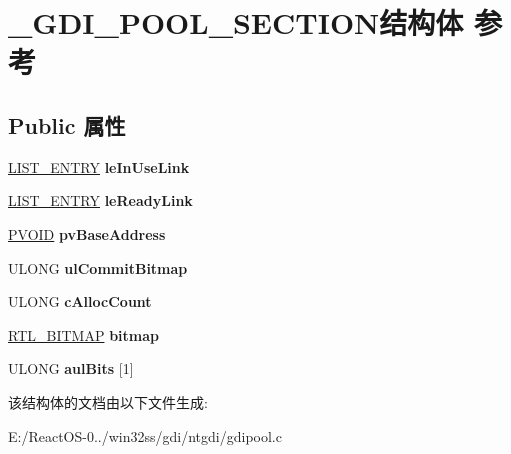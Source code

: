 \hypertarget{struct___g_d_i___p_o_o_l___s_e_c_t_i_o_n}{}\section{\+\_\+\+G\+D\+I\+\_\+\+P\+O\+O\+L\+\_\+\+S\+E\+C\+T\+I\+O\+N结构体 参考}
\label{struct___g_d_i___p_o_o_l___s_e_c_t_i_o_n}
\subsection*{Public 属性}
\begin{DoxyCompactItemize}
\item 
\mbox{\label{struct___g_d_i___p_o_o_l___s_e_c_t_i_o_n_aae8cff0e484ee8f9db59a066897f61fd}} 
\hyperlink{struct___l_i_s_t___e_n_t_r_y}{L\+I\+S\+T\+\_\+\+E\+N\+T\+RY} {\bfseries le\+In\+Use\+Link}
\item 
\mbox{\label{struct___g_d_i___p_o_o_l___s_e_c_t_i_o_n_a496d76145f30e0a9a3a3079f5e002039}} 
\hyperlink{struct___l_i_s_t___e_n_t_r_y}{L\+I\+S\+T\+\_\+\+E\+N\+T\+RY} {\bfseries le\+Ready\+Link}
\item 
\mbox{\label{struct___g_d_i___p_o_o_l___s_e_c_t_i_o_n_aae98c395dd385499dbb0de954510465c}} 
\hyperlink{interfacevoid}{P\+V\+O\+ID} {\bfseries pv\+Base\+Address}
\item 
\mbox{\label{struct___g_d_i___p_o_o_l___s_e_c_t_i_o_n_a71e9529b3ab61be90b353dab2d36fb0a}} 
U\+L\+O\+NG {\bfseries ul\+Commit\+Bitmap}
\item 
\mbox{\label{struct___g_d_i___p_o_o_l___s_e_c_t_i_o_n_a4022b894a0fa64c92beedff749d303d9}} 
U\+L\+O\+NG {\bfseries c\+Alloc\+Count}
\item 
\mbox{\label{struct___g_d_i___p_o_o_l___s_e_c_t_i_o_n_a5fc9395b20f29b8e58c867a1f0d834dc}} 
\hyperlink{struct___r_t_l___b_i_t_m_a_p}{R\+T\+L\+\_\+\+B\+I\+T\+M\+AP} {\bfseries bitmap}
\item 
\mbox{\label{struct___g_d_i___p_o_o_l___s_e_c_t_i_o_n_a01eae22a623539ce29e930a939fb1d59}} 
U\+L\+O\+NG {\bfseries aul\+Bits} \mbox{[}1\mbox{]}
\end{DoxyCompactItemize}


该结构体的文档由以下文件生成\+:\begin{DoxyCompactItemize}
\item 
E\+:/\+React\+O\+S-\/0../win32ss/gdi/ntgdi/gdipool.\+c\end{DoxyCompactItemize}
